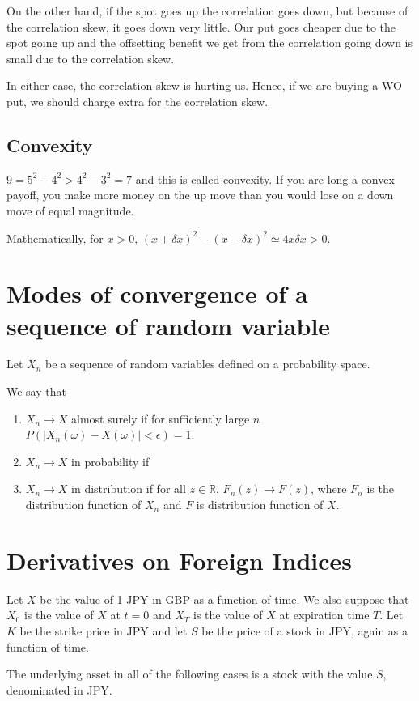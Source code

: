 \documentclass{amsart}
\theoremstyle{plain}
\numberwithin{equation}{section}
\begin{document}
On the other hand, if the spot goes up the correlation 
goes down, but because of the correlation skew,
it goes down very little. Our put goes cheaper due to 
the spot going up and the offsetting 
benefit we get from the correlation going down
is small due to the correlation skew.

In either case, the correlation skew is hurting us.
Hence, if we are buying a WO put, we should
charge extra for the correlation skew.
\subsection{Convexity}
$9 = 5^2 - 4^2 > 4^2 - 3^2 = 7$ and this is called convexity.
If you are long a convex payoff, you make more money 
on the up move than you would lose on a down move of equal magnitude.

Mathematically, for $x>0$,
$(x+\delta x)^2 - (x - \delta x )^2 \simeq 4x\delta x > 0$.

\section*{Modes of convergence of a sequence of random variable}
Let $X_n$ be a sequence of random variables defined on a probability 
space. 

We say that 
\begin{enumerate}
\item $X_n \to X$ almost surely 
if for sufficiently large $n$
$P(|X_n(\omega)-X(\omega)| < \epsilon) = 1$.
\item $X_n \to X$ in probability 
if 

\item $X_n \to X$ in distribution
if for all $z \in \mathbb{R}$, 
$F_n(z) \to F(z)$, where
$F_n$ is the distribution function of 
$X_n$ and $F$ is distribution function 
of $X$.
\end{enumerate}

\section*{Derivatives on Foreign Indices}
Let $X$ be the value of 1 JPY in GBP as
a function of time. We also suppose that 
$X_0$ is the value of $X$ at $t=0$ and 
$X_T$ is the value of $X$ at expiration time $T$.
Let $K$ be the strike price in JPY and 
let $S$ be the price of a stock in JPY, again
as a function of time. 

The underlying asset in all of the following cases
is a stock with the value $S$, denominated in JPY. 
\end{document}
